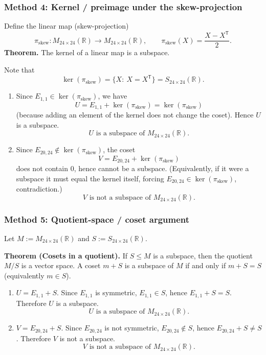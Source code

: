\documentclass[12pt]{article}
\let\amsboxed\boxed
\renewcommand{\boxed}[1]{\amsboxed{\,#1\,}}
\begin{document}
\subsubsection{Method 4: Kernel / preimage under the skew-projection}
Define the linear map (skew-projection)
\[
\pi_{\mathrm{skew}}:M_{24\times 24}(\mathbb{R})\to M_{24\times 24}(\mathbb{R}),\qquad
\pi_{\mathrm{skew}}(X)=\frac{X-X^{\mathsf T}}{2}.
\]
\textbf{Theorem.} The kernel of a linear map is a subspace.

Note that
\[
\ker(\pi_{\mathrm{skew}})=\{X:\ X=X^{\mathsf T}\}=S_{24\times 24}(\mathbb{R}).
\]

\begin{enumerate}[label=(\alph*)]
\item Since $E_{1,1}\in\ker(\pi_{\mathrm{skew}})$, we have
\[
U=E_{1,1}+\ker(\pi_{\mathrm{skew}})=\ker(\pi_{\mathrm{skew}})
\]
(because adding an element of the kernel does not change the coset). Hence $U$ is a subspace.
\[
\boxed{\,U\text{ is a subspace of }M_{24\times 24}(\mathbb{R}).\,}
\]

\item Since $E_{20,24}\notin\ker(\pi_{\mathrm{skew}})$, the coset
\[
V=E_{20,24}+\ker(\pi_{\mathrm{skew}})
\]
does not contain $0$, hence cannot be a subspace. (Equivalently, if it were a subspace it must equal the kernel itself, forcing $E_{20,24}\in\ker(\pi_{\mathrm{skew}})$, contradiction.)
\[
\boxed{\,V\text{ is not a subspace of }M_{24\times 24}(\mathbb{R}).\,}
\]
\end{enumerate}
\bigskip
\subsubsection{Method 5: Quotient-space / coset argument}
Let $M:=M_{24\times 24}(\mathbb{R})$ and $S:=S_{24\times 24}(\mathbb{R})$.

\textbf{Theorem (Cosets in a quotient).}
If $S\le M$ is a subspace, then the quotient $M/S$ is a vector space. A coset $m+S$ is a subspace of $M$ if and only if $m+S=S$ (equivalently $m\in S$).

\begin{enumerate}[label=(\alph*)]
\item $U=E_{1,1}+S$. Since $E_{1,1}$ is symmetric, $E_{1,1}\in S$, hence $E_{1,1}+S=S$. Therefore $U$ is a subspace.
\[
\boxed{\,U\text{ is a subspace of }M_{24\times 24}(\mathbb{R}).\,}
\]

\item $V=E_{20,24}+S$. Since $E_{20,24}$ is not symmetric, $E_{20,24}\notin S$, hence $E_{20,24}+S\neq S$. Therefore $V$ is not a subspace.
\[
\boxed{\,V\text{ is not a subspace of }M_{24\times 24}(\mathbb{R}).\,}
\]
\end{enumerate}
\bigskip
\end{document}
